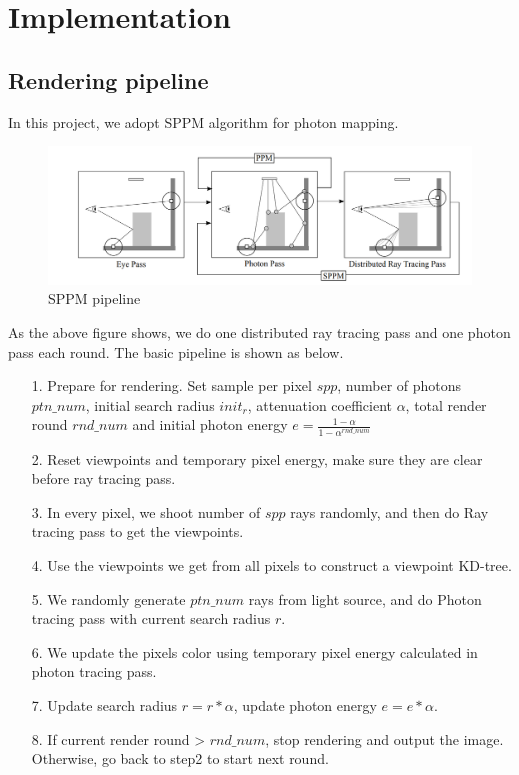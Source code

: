 \documentclass[acmtog]{acmart}
\begin{document}
\section{Implementation}
	\subsection{Rendering pipeline}
		In this project, we adopt SPPM algorithm for photon mapping.
		\begin{figure}[H]
			\centering
			\includegraphics[scale=0.18]{Images/sppm.png}
			\caption{SPPM pipeline}\label{}
			\end{figure}
		As the above figure shows, we do one distributed ray tracing pass and one photon pass each round. The basic pipeline is shown as below.
		\begin{enumerate}
			\item [1.] Prepare for rendering. Set sample per pixel $spp$, number of photons $ptn\_num$, initial search radius $init_r$, 
			attenuation coefficient $\alpha$, total render round $rnd\_num$ and initial photon energy $e = \frac{1 - \alpha}{1 - \alpha^{rnd\_num}}$
			\item [2.] Reset viewpoints and temporary pixel energy, make sure they are clear before ray tracing pass.
			\item [3.] In every pixel, we shoot number of $spp$ rays randomly, and then do Ray tracing pass to get the viewpoints.
			\item [4.] Use the viewpoints we get from all pixels to construct a viewpoint KD-tree.
			\item [5.] We randomly generate $ptn\_num$ rays from light source, and do Photon tracing pass with current search radius $r$.
			\item [6.] We update the pixels color using temporary pixel energy calculated in photon tracing pass.
			\item [7.] Update search radius $r = r * \alpha$, update photon energy $e = e * \alpha$.
			\item [8.] If current render round > $rnd\_num$, stop rendering and output the image. Otherwise, go back to step2 to start next round.
		\end{enumerate}
\end{document}
